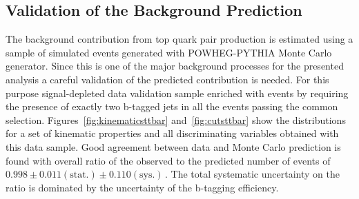\subsection{Validation of the \ttbar Background Prediction}
\label{sec:top_est}

The background contribution from top quark pair production is estimated using a sample of simulated events generated with POWHEG-PYTHIA Monte Carlo
generator. Since this is one of the major background processes for the presented analysis a careful validation 
of the predicted contribution is needed. For this purpose
signal-depleted data validation sample  enriched with \ttbar events  by requiring the presence of exactly two b-tagged jets in all the events
passing the common selection.
Figures~\ref{fig:kinematicsttbar} and~\ref{fig:cutsttbar} show the distributions for a set of kinematic properties and all discriminating 
variables obtained with this  data sample. Good agreement between data and Monte Carlo prediction is found with 
overall ratio of the observed to the predicted number of \ttbar events of $0.998 \pm 0.011\mathrm{(stat.)} \pm 0.110 \mathrm{(sys.)}\,.$
The total systematic uncertainty on the ratio is dominated by the uncertainty of the b-tagging efficiency. 
%

